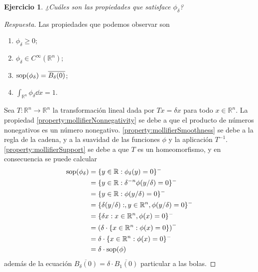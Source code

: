 \documentclass{article}
\newcommand{\realNumbers}{\mathbb{R}}
\newtheorem{exercise}{Ejercicio}
\DeclareMathOperator{\support}{\textnormal{sop}}
\theoremstyle{remark}
\begin{document}
\begin{exercise}
  ¿Cuáles son las propiedades que satisface \(\phi_{\delta}\)?
\end{exercise}
\begin{proof}[Respuesta]
  Las propiedades que podemos observar son
  \begin{enumerate}[label=\alph*)]
    \item 
      \label{property:mollifierNonnegativity}
      \(\phi_{\delta} \geq 0\);
    \item 
      \label{property:mollifierSmoothness}
      \(\phi_{\delta} \in C^{\infty}(\realNumbers^n)\);
    \item 
      \label{property:mollifierSupport}
      \(\support(\phi_{\delta}) = \overline{B_{\delta}(0)}\);
    \item 
      \label{property:mollifierIntegral}
      \(\int_{\realNumbers^n} \phi_{\delta} \dd x = 1\).
  \end{enumerate}
  Sea \(T : \realNumbers^n \rightarrow \realNumbers^n\) la transformación lineal dada por \(T x = \delta x\) para todo \(x \in \realNumbers^n\).
  La propiedad
  \ref{property:mollifierNonnegativity}
  se debe a que el producto de números nonegativos es un número nonegativo.
  \ref{property:mollifierSmoothness}
  se debe a la regla de la cadena, y a la suavidad de las funciones \(\phi\) y la aplicación \(T^{- 1}\).
  \ref{property:mollifierSupport}
  se debe a que \(T\) es un homeomorfismo, y en consecuencia se puede calcular
  \begin{align}
    \support(\phi_{\delta})
    &=
    \{y \in \realNumbers : \phi_{\delta}(y) = 0\}^-
    \\
    &=
    \{y \in \realNumbers : \delta^{- n} \phi(y / \delta) = 0\}^-
    \\
    &=
    \{y \in \realNumbers : \phi(y / \delta) = 0\}^-
    \\
    &=
    \{\delta (y / \delta) :, y \in \realNumbers^n, \phi(y / \delta) = 0\}^-
    \\
    &=
    \{\delta x : x \in \realNumbers^n, \phi(x) = 0\}^-
    \\
    &=
    \left(
      \delta \cdot
      \{x \in \realNumbers^n: \phi(x) = 0\}
    \right)^-
    \\
    &=
    \delta \cdot 
    \{x \in \realNumbers^n: \phi(x) = 0\}^-
    \\
    &=
    \delta \cdot 
    \support(\phi)
  \end{align}
  además de la ecuación \(\overline{B_{\delta}(0)} = \delta \cdot \overline{B_1(0)}\) particular a las bolas.

\end{proof}
\end{document}
